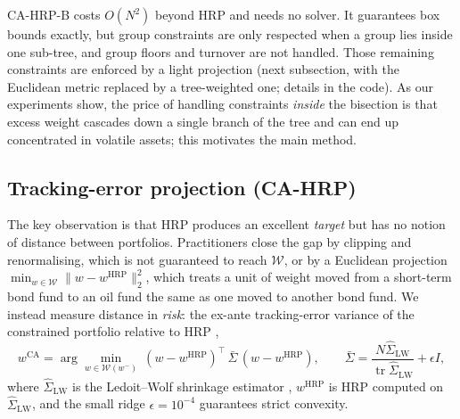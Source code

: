 CA-HRP-B costs $O(N^2)$ beyond HRP and needs no solver. It guarantees box bounds exactly,
but group constraints are only respected when a group lies inside one sub-tree, and group
floors and turnover are not handled. Those remaining constraints are enforced by a light
projection (next subsection, with the Euclidean metric replaced by a tree-weighted one;
details in the code). As our experiments show, the price of handling constraints
\emph{inside} the bisection is that excess weight cascades down a single branch of the
tree and can end up concentrated in volatile assets; this motivates the main method.

\subsection{Tracking-error projection (CA-HRP)}
The key observation is that HRP produces an excellent \emph{target} but has no notion of
distance between portfolios. Practitioners close the gap by clipping and renormalising,
which is not guaranteed to reach $\mathcal{W}$, or by a Euclidean projection
$\min_{w\in\mathcal{W}}\lVert w-w^{\mathrm{HRP}}\rVert_2^2$, which treats a unit of weight
moved from a short-term bond fund to an oil fund the same as one moved to another bond fund.
We instead measure distance in \emph{risk}: the ex-ante tracking-error variance of the
constrained portfolio relative to HRP \citep{roll1992},
\begin{equation}\label{eq:te}
w^{\mathrm{CA}}=\arg\min_{w\in\mathcal{W}(w^-)}\ (w-w^{\mathrm{HRP}})^\top\,\bar\Sigma\,
(w-w^{\mathrm{HRP}}),\qquad
\bar\Sigma=\frac{N\hat\Sigma_{\mathrm{LW}}}{\operatorname{tr}\hat\Sigma_{\mathrm{LW}}}+\epsilon I,
\end{equation}
where $\hat\Sigma_{\mathrm{LW}}$ is the Ledoit--Wolf shrinkage estimator
\citep{ledoit2004}, $w^{\mathrm{HRP}}$ is HRP computed on $\hat\Sigma_{\mathrm{LW}}$, and
the small ridge $\epsilon=10^{-4}$ guarantees strict convexity.

